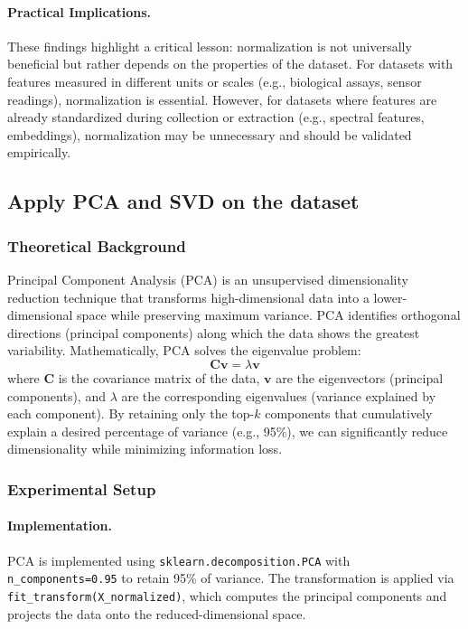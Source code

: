 \documentclass[12pt]{article}
\begin{document}
\paragraph{Practical Implications.} These findings highlight a critical lesson: normalization is not universally beneficial but rather depends on the properties of the dataset. For datasets with features measured in different units or scales (e.g., biological assays, sensor readings), normalization is essential. However, for datasets where features are already standardized during collection or extraction (e.g., spectral features, embeddings), normalization may be unnecessary and should be validated empirically.

\subsection{Apply PCA and SVD on the dataset}

\subsubsection{Theoretical Background}
Principal Component Analysis (PCA) is an unsupervised dimensionality reduction technique that transforms high-dimensional data into a lower-dimensional space while preserving maximum variance. PCA identifies orthogonal directions (principal components) along which the data shows the greatest variability. Mathematically, PCA solves the eigenvalue problem:
\begin{equation}
    \mathbf{C}\mathbf{v} = \lambda\mathbf{v}
\end{equation}
where $\mathbf{C}$ is the covariance matrix of the data, $\mathbf{v}$ are the eigenvectors (principal components), and $\lambda$ are the corresponding eigenvalues (variance explained by each component). By retaining only the top-$k$ components that cumulatively explain a desired percentage of variance (e.g., 95\%), we can significantly reduce dimensionality while minimizing information loss.

\subsubsection{Experimental Setup}

\paragraph{Implementation.} PCA is implemented using \texttt{sklearn.decomposition.PCA} with \texttt{n\_components=0.95} to retain 95\% of variance. The transformation is applied via \texttt{fit\_transform(X\_normalized)}, which computes the principal components and projects the data onto the reduced-dimensional space.
\end{document}
